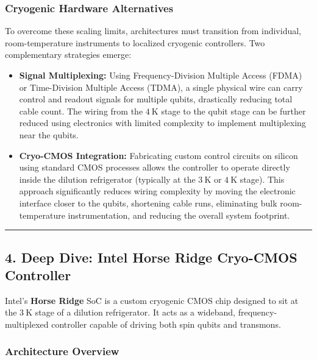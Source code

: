 \documentclass[
]{article}
\providecommand{\tightlist}{%
  \setlength{\itemsep}{0pt}\setlength{\parskip}{0pt}}
\begin{document}
\subsubsection{Cryogenic Hardware
Alternatives}\label{cryogenic-hardware-alternatives}

To overcome these scaling limits, architectures must transition from
individual, room-temperature instruments to localized cryogenic
controllers. Two complementary strategies emerge:

\begin{itemize}
\tightlist
\item
  \textbf{Signal Multiplexing:} Using Frequency-Division Multiple Access
  (FDMA) or Time-Division Multiple Access (TDMA), a single physical wire
  can carry control and readout signals for multiple qubits, drastically
  reducing total cable count. The wiring from the \(4\ \text{K}\) stage
  to the qubit stage can be further reduced using electronics with
  limited complexity to implement multiplexing near the qubits.
\item
  \textbf{Cryo-CMOS Integration:} Fabricating custom control circuits on
  silicon using standard CMOS processes allows the controller to operate
  directly inside the dilution refrigerator (typically at the
  \(3\ \text{K}\) or \(4\ \text{K}\) stage). This approach significantly
  reduces wiring complexity by moving the electronic interface closer to
  the qubits, shortening cable runs, eliminating bulk room-temperature
  instrumentation, and reducing the overall system footprint.
\end{itemize}

\begin{center}\rule{0.5\linewidth}{0.5pt}\end{center}

\subsection{4. Deep Dive: Intel Horse Ridge Cryo-CMOS
Controller}\label{deep-dive-intel-horse-ridge-cryo-cmos-controller}

Intel's \textbf{Horse Ridge} SoC is a custom cryogenic CMOS chip
designed to sit at the \(3\ \text{K}\) stage of a dilution refrigerator.
It acts as a wideband, frequency-multiplexed controller capable of
driving both spin qubits and transmons.

\subsubsection{Architecture Overview}\label{architecture-overview}
\end{document}
